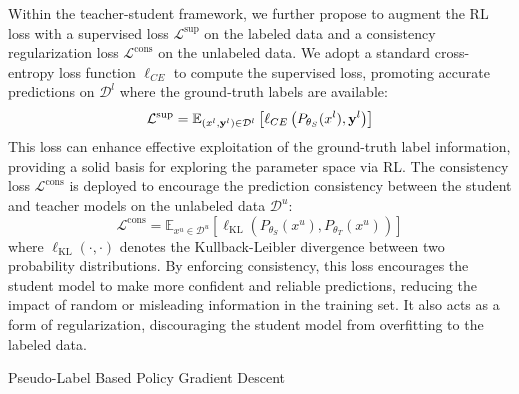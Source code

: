 Within the teacher-student framework, we further propose to augment the RL loss 
with a supervised loss $\mathcal{L}^{\text{sup}}$ on the labeled data 
and a consistency regularization loss $\mathcal{L}^{\text{cons}}$ on the unlabeled data. 
We adopt a standard cross-entropy loss function $\ell_{CE}$ to compute the supervised loss,
promoting accurate predictions on $\mathcal{D}^l$
where the ground-truth labels are available: 
\begin{equation}
\label{eq:cl-loss}
\mathcal{L}^{\text{sup}} = 
	\mathbb{E}_{(x^{l}, {\bf y}^{l})\in \mathcal{D}^l}
	\left[\ell_{CE}\left(P_{\theta_{S}}(x^{l}),{\bf y}^{l}\right) \right]
\end{equation}
This loss can enhance effective exploitation of the ground-truth label information, 
providing a solid basis for exploring the parameter space via RL. 
The consistency loss $\mathcal{L}^{\text{cons}}$ is deployed to encourage 
the prediction consistency between the student and teacher models on the unlabeled data $\mathcal{D}^u$:
\begin{equation}
\label{eq:cons-loss}
\mathcal{L}^{\text{cons}} = 
	\mathbb{E}_{x^u\in\mathcal{D}^u} \left[\ell_{\text{KL}}\left(P_{\theta_{S}}(x^u), P_{\theta_T}(x^u)\right)\right]
\end{equation}
where $\ell_{\text{KL}}(\cdot,\cdot)$ denotes the Kullback-Leibler divergence 
between two probability distributions.
By enforcing consistency, this loss encourages the student model to make more confident and reliable predictions, 
reducing the impact of random or misleading information in the training set.
It also acts as a form of regularization, discouraging the student model from overfitting to the labeled data.

\begin{algorithm}[t]
  \caption{Pseudo-Label Based Policy Gradient Descent}
\label{alg:batch-wise2}
\end{algorithm}


